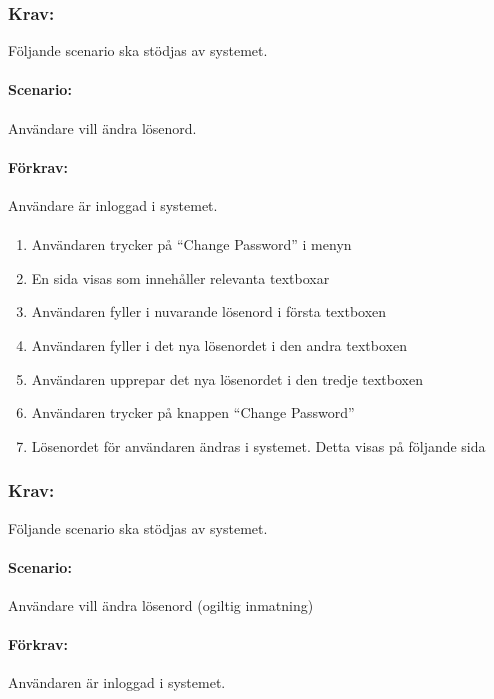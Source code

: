 \documentclass[paper=a4, fontsize=11pt,twoside]{article}
\begin{document}
	\subsubsection*{Krav:} Följande scenario ska stödjas av systemet.
	\paragraph{Scenario:}Användare vill ändra lösenord.
	\paragraph{Förkrav:}
	Användare är inloggad i systemet.
	\paragraph{}
	\begin{enumerate}
		\item	Användaren trycker på “Change Password” i menyn
		\item	En sida visas som innehåller relevanta textboxar
		\item	Användaren fyller i nuvarande lösenord i första textboxen
		\item	Användaren fyller i det nya lösenordet i den andra textboxen
		\item	Användaren upprepar det nya lösenordet i den tredje textboxen
		\item	Användaren trycker på knappen “Change Password”
		\item	Lösenordet för användaren ändras i systemet. Detta visas på följande sida
		
	\end{enumerate}
	
	\subsubsection*{Krav:}Följande scenario ska stödjas av systemet.
	\paragraph{Scenario:}Användare vill ändra lösenord (ogiltig inmatning)
	\paragraph{Förkrav:}
	Användaren är inloggad i systemet.
\end{document}
